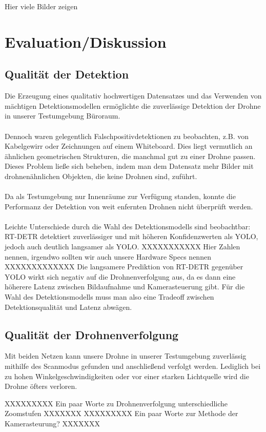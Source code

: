 \documentclass[runningheads]{llncs}
\begin{document}
Hier viele Bilder zeigen

\section{Evaluation/Diskussion}
\subsection{Qualität der Detektion}
Die Erzeugung eines qualitativ hochwertigen Datensatzes und das Verwenden von mächtigen Detektionsmodellen ermöglichte die zuverlässige Detektion der Drohne in unserer Testumgebung Büroraum.\\\\
Dennoch waren gelegentlich Falschpositivdetektionen zu beobachten, z.B. von Kabelgewirr oder Zeichnungen auf einem Whiteboard. Dies liegt vermutlich an ähnlichen geometrischen Strukturen, die manchmal gut zu einer Drohne passen. Dieses Problem ließe sich beheben, indem man dem Datensatz mehr Bilder mit drohnenähnlichen Objekten, die keine Drohnen sind, zuführt.\\\\
Da als Testumgebung nur Innenräume zur Verfügung standen, konnte die Performanz der Detektion von weit enfernten Drohnen nicht überprüft werden.\\\\
Leichte Unterschiede durch die Wahl des Detektionsmodells sind beobachtbar: RT-DETR detektiert zuverlässiger und mit höheren Konfidenzwerten als YOLO, jedoch auch deutlich langsamer als YOLO. XXXXXXXXXXX Hier Zahlen nennen, irgendwo sollten wir auch unsere Hardware Specs nennen XXXXXXXXXXXXX
Die langsamere Prediktion von RT-DETR gegenüber YOLO wirkt sich negativ auf die Drohnenverfolgung aus, da es dann eine höherere Latenz zwischen Bildaufnahme und Kamerasteuerung gibt.
Für die Wahl des Detektionsmodells muss man also eine Tradeoff zwischen Detektionsqualität und Latenz abwägen.
\subsection{Qualität der Drohnenverfolgung}
Mit beiden Netzen kann unsere Drohne in unserer Testumgebung zuverlässig mithilfe des Scanmodus gefunden und anschließend verfolgt werden.
Lediglich bei zu hohen Winkelgeschwindigkeiten oder vor einer starken Lichtquelle wird die Drohne öfters verloren.

XXXXXXXXX Ein paar Worte zu Drohnenverfolgung unterschiedliche Zoomstufen XXXXXXX
XXXXXXXXX Ein paar Worte zur Methode der Kamerasteurung? XXXXXXX
\end{document}
